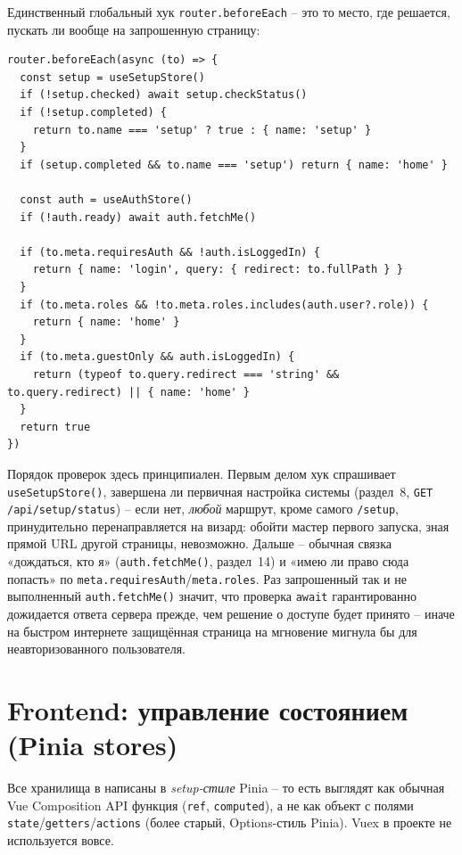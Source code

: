 Единственный глобальный хук \texttt{router.beforeEach} -- это то место,
где решается, пускать ли вообще на запрошенную страницу:
\begin{verbatim}
router.beforeEach(async (to) => {
  const setup = useSetupStore()
  if (!setup.checked) await setup.checkStatus()
  if (!setup.completed) {
    return to.name === 'setup' ? true : { name: 'setup' }
  }
  if (setup.completed && to.name === 'setup') return { name: 'home' }

  const auth = useAuthStore()
  if (!auth.ready) await auth.fetchMe()

  if (to.meta.requiresAuth && !auth.isLoggedIn) {
    return { name: 'login', query: { redirect: to.fullPath } }
  }
  if (to.meta.roles && !to.meta.roles.includes(auth.user?.role)) {
    return { name: 'home' }
  }
  if (to.meta.guestOnly && auth.isLoggedIn) {
    return (typeof to.query.redirect === 'string' && to.query.redirect) || { name: 'home' }
  }
  return true
})
\end{verbatim}
Порядок проверок здесь принципиален. Первым делом хук спрашивает
\texttt{useSetupStore()}, завершена ли первичная настройка системы
(раздел~8, \texttt{GET /api/setup/status}) -- если нет, \emph{любой}
маршрут, кроме самого \texttt{/setup}, принудительно перенаправляется на
визард: обойти мастер первого запуска, зная прямой URL другой страницы,
невозможно. Дальше -- обычная связка «дождаться, кто я» (\texttt{auth.fetchMe()},
раздел~14) и «имею ли право сюда попасть» по \texttt{meta.requiresAuth}/\texttt{meta.roles}.
Раз запрошенный так и не выполненный \texttt{auth.fetchMe()} значит, что
проверка \texttt{await} гарантированно дожидается ответа сервера прежде,
чем решение о доступе будет принято -- иначе на быстром интернете
защищённая страница на мгновение мигнула бы для неавторизованного
пользователя.

\section{Frontend: управление состоянием (Pinia stores)}

Все хранилища в  написаны в
\emph{setup-стиле} Pinia -- то есть выглядят как обычная Vue Composition
API функция (\texttt{ref}, \texttt{computed}), а не как объект с полями
\texttt{state}/\texttt{getters}/\texttt{actions} (более старый,
Options-стиль Pinia). Vuex в проекте не используется вовсе.

